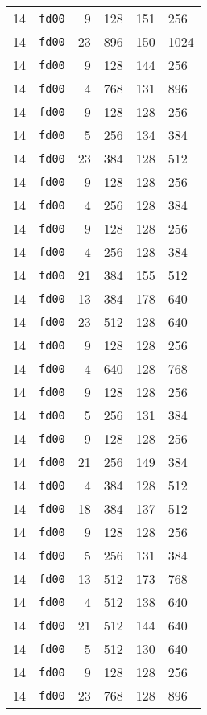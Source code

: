 \documentclass{article}
\begin{document}
\begin{table}[h!]
\begin{tabular}{llrrrl}
    14 & \texttt{fd00} & 9 & 128 & 151 & 256 \\
    14 & \texttt{fd00} & 23 & 896 & 150 & 1024 \\
    14 & \texttt{fd00} & 9 & 128 & 144 & 256 \\
    14 & \texttt{fd00} & 4 & 768 & 131 & 896 \\
    14 & \texttt{fd00} & 9 & 128 & 128 & 256 \\
    14 & \texttt{fd00} & 5 & 256 & 134 & 384 \\
    14 & \texttt{fd00} & 23 & 384 & 128 & 512 \\
    14 & \texttt{fd00} & 9 & 128 & 128 & 256 \\
    14 & \texttt{fd00} & 4 & 256 & 128 & 384 \\
    14 & \texttt{fd00} & 9 & 128 & 128 & 256 \\
    14 & \texttt{fd00} & 4 & 256 & 128 & 384 \\
    14 & \texttt{fd00} & 21 & 384 & 155 & 512 \\
    14 & \texttt{fd00} & 13 & 384 & 178 & 640 \\
    14 & \texttt{fd00} & 23 & 512 & 128 & 640 \\
    14 & \texttt{fd00} & 9 & 128 & 128 & 256 \\
    14 & \texttt{fd00} & 4 & 640 & 128 & 768 \\
    14 & \texttt{fd00} & 9 & 128 & 128 & 256 \\
    14 & \texttt{fd00} & 5 & 256 & 131 & 384 \\
    14 & \texttt{fd00} & 9 & 128 & 128 & 256 \\
    14 & \texttt{fd00} & 21 & 256 & 149 & 384 \\
    14 & \texttt{fd00} & 4 & 384 & 128 & 512 \\
    14 & \texttt{fd00} & 18 & 384 & 137 & 512 \\
    14 & \texttt{fd00} & 9 & 128 & 128 & 256 \\
    14 & \texttt{fd00} & 5 & 256 & 131 & 384 \\
    14 & \texttt{fd00} & 13 & 512 & 173 & 768 \\
    14 & \texttt{fd00} & 4 & 512 & 138 & 640 \\
    14 & \texttt{fd00} & 21 & 512 & 144 & 640 \\
    14 & \texttt{fd00} & 5 & 512 & 130 & 640 \\
    14 & \texttt{fd00} & 9 & 128 & 128 & 256 \\
    14 & \texttt{fd00} & 23 & 768 & 128 & 896 \\

\end{tabular}
\end{table}
\end{document}
